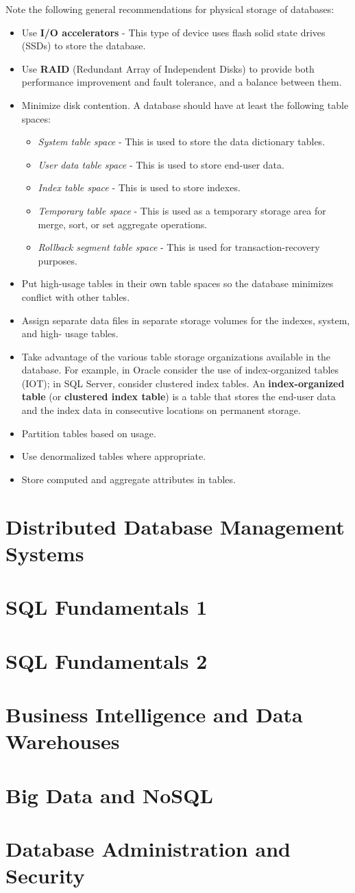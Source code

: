 \documentclass[a4paper, 11pt, titlepage]{report}
\begin{document}
Note the following general recommendations for physical storage of databases:
\begin{itemize}
\item Use \textbf{I/O accelerators} - This type of device uses flash solid state drives (SSDs) to store
the database.
\item Use \textbf{RAID} (Redundant Array of Independent Disks) to provide both performance improvement and fault tolerance, and a balance between them.
\item Minimize disk contention. A database should have at least the following table spaces:
\begin{itemize}
\item \textit{System table space} - This is used to store the data dictionary tables.
\item \textit{User data table space} - This is used to store end-user data. 
\item \textit{Index table space} - This is used to store indexes. 
\item \textit{Temporary table space} - This is used as a temporary storage area for merge, sort,
or set aggregate operations.
\item \textit{Rollback segment table space} - This is used for transaction-recovery purposes.
\end{itemize}
\item Put high-usage tables in their own table spaces so the database minimizes conflict
with other tables.
\item Assign separate data files in separate storage volumes for the indexes, system, and high-
usage tables.
\item Take advantage of the various table storage organizations available in the database. For example, in Oracle consider the use of index-organized tables (IOT); in SQL Server, consider clustered index tables. An \textbf{index-organized table} (or \textbf{clustered index table}) is a table that stores the end-user data and the index data in consecutive locations on permanent storage.
\item Partition tables based on usage.
\item Use denormalized tables where appropriate.
\item Store computed and aggregate attributes in tables.
\end{itemize}
\chapter{Distributed Database Management Systems}
\chapter{SQL Fundamentals 1}
\chapter{SQL Fundamentals 2}
\chapter{Business Intelligence and Data Warehouses}
\chapter{Big Data and NoSQL}
\chapter{Database Administration and Security}
\end{document}
